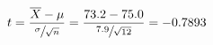\begin{equation*}
    t=\frac{\overline{X}-\mu}{\sfrac{\sigma}{\sqrt{n}}}
    =\frac{73.2-75.0}{\sfrac{7.9}{\sqrt{12}}}=-0.7893
    \end{equation*}
